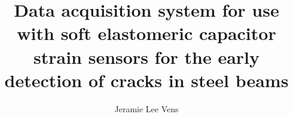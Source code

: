\title{Data acquisition system for use with soft elastomeric capacitor\\strain sensors for the early detection of cracks in steel beams}
\author{Jeramie Lee Vens}
\notice
\maketitle
